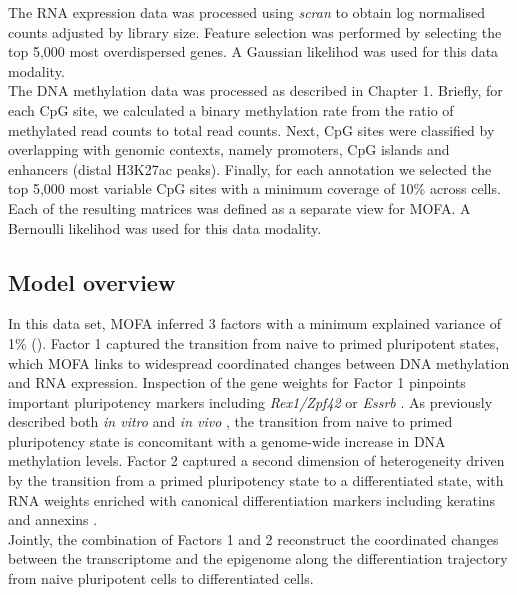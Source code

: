 The RNA expression data was processed using \textit{scran}\cite{Lun2016b} to obtain log normalised counts adjusted by library size. Feature selection was performed by selecting the top 5,000 most overdispersed genes\cite{Lun2016a}. A Gaussian likelihod was used for this data modality. \\
The DNA methylation data was processed as described in Chapter 1. Briefly, for each CpG site, we calculated a binary methylation rate from the ratio of methylated read counts to total read counts. Next, CpG sites were classified by overlapping with genomic contexts, namely promoters, CpG islands and enhancers (distal H3K27ac peaks). Finally, for each annotation we selected the top 5,000 most variable CpG sites with a minimum coverage of 10\% across cells. Each of the resulting matrices was defined as a separate view for MOFA. A Bernoulli likelihod was used for this data modality.


\subsection{Model overview}

In this data set, MOFA inferred 3 factors with a minimum explained variance of 1\% (). Factor 1 captured the transition from naive to primed pluripotent states, which MOFA links to widespread coordinated changes between DNA methylation and RNA expression. Inspection of the gene weights for Factor 1 pinpoints important pluripotency markers including  \textit{Rex1/Zpf42} or \textit{Essrb} \cite{Mohammed2017}. As previously described both \textit{in vitro} \cite{Angermueller2016} and \textit{in vivo} \cite{Auclair2014}, the transition from naive to primed pluripotency state is concomitant with a genome-wide increase in DNA methylation levels. Factor 2 captured a second dimension of heterogeneity driven by the transition from a primed pluripotency state to a differentiated state, with RNA weights enriched with canonical differentiation markers including keratins and annexins \cite{Fuchs1988}.\\
Jointly, the combination of Factors 1 and 2 reconstruct the coordinated changes between the transcriptome and the epigenome along the differentiation trajectory from naive pluripotent cells to differentiated cells.

